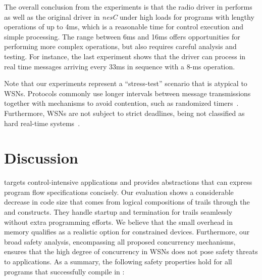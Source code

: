 The overall conclusion from the experiments is that the radio driver in \CEU 
performs as well as the original driver in \emph{nesC} under high loads for 
programs with lengthy operations of up to 4ms, which is a reasonable time for 
control execution and simple processing.
%
The range between 6ms and 16ms offers opportunities for performing more complex 
operations, but also requires careful analysis and testing.
%
For instance, the last experiment shows that the \CEU driver can process in 
real time messages arriving every 33ms in sequence with a 8-ms operation.
%

Note that our experiments represent a ``stress-test'' scenario that is atypical 
to WSNs.
Protocols commonly use longer intervals between message transmissions together 
with mechanisms to avoid contention, such as randomized 
timers~\cite{wsn.trickle,wsn.ctp}.
Furthermore, WSNs are not subject to strict deadlines, being not classified as 
hard real-time systems~\cite{wsn.decade}.

\section{Discussion}

\CEU targets control-intensive applications and provides abstractions that can 
express program flow specifications concisely.
%
Our evaluation shows a considerable decrease in code size that comes from 
logical compositions of trails through the  and  
constructs.
%
They handle startup and termination for trails seamlessly without extra 
programming efforts.
%
We believe that the small overhead in memory qualifies \CEU as a realistic 
option for constrained devices.
%
%
%
%
%
Furthermore, our broad safety analysis, encompassing all proposed concurrency 
mechanisms, ensures that the high degree of concurrency in WSNs does not pose 
safety threats to applications.
%
%
%
As a summary, the following safety properties hold for all programs that 
successfully compile in \CEU:

